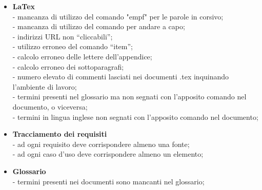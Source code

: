 \begin{itemize}
\item \textbf{LaTex}\\

- mancanza di utilizzo del comando "empf" per le parole in corsivo;\\
- mancanza di utilizzo del comando per andare a capo;\\
- indirizzi URL non “cliccabili”;\\
- utilizzo erroneo del comando “item”;\\
- calcolo erroneo delle lettere dell’appendice;\\
- calcolo erroneo dei sottoparagrafi; \\
- numero elevato di commenti lasciati nei documenti .tex inquinando l’ambiente di lavoro;\\
- termini presenti nel glossario ma non segnati con l’apposito comando nel documento, o viceversa;\\
- termini in lingua inglese non segnati con l’apposito comando nel documento;\\



\item \textbf{Tracciamento dei requisiti}\\


- ad ogni requisito deve corrispondere almeno una fonte;\\
- ad ogni caso d’uso deve corrispondere almeno un elemento;\\


\item \textbf{Glossario}\\

- termini presenti nei documenti sono mancanti nel glossario;



\end{itemize}






































